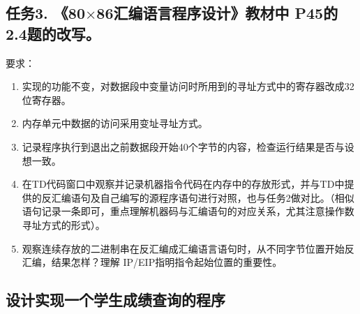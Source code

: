 \documentclass{article}
\begin{document}
	\subsection[任务3]{任务3. 《80$\times$86汇编语言程序设计》教材中 P45的 2.4题的改写。}
	要求：
	\begin{enumerate}
		\item 实现的功能不变，对数据段中变量访问时所用到的寻址方式中的寄存器改成32位寄存器。
		\item 内存单元中数据的访问采用变址寻址方式。
		\item 记录程序执行到退出之前数据段开始40个字节的内容，检查运行结果是否与设想一致。
		\item 在TD代码窗口中观察并记录机器指令代码在内存中的存放形式，并与TD中提供的反汇编语句及自己编写的源程序语句进行对照，也与任务2做对比。（相似语句记录一条即可，重点理解机器码与汇编语句的对应关系，尤其注意操作数寻址方式的形式）。
		\item 观察连续存放的二进制串在反汇编成汇编语言语句时，从不同字节位置开始反汇编，结果怎样？理解 IP/EIP指明指令起始位置的重要性。
	\end{enumerate}

	\subsection[任务4]{设计实现一个学生成绩查询的程序}
\end{document}
